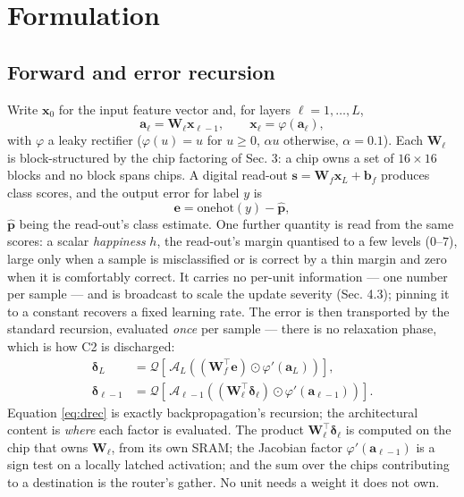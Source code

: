 \documentclass[11pt]{article}
\newcommand{\W}{\bm W}
\newcommand{\x}{\bm x}
\newcommand{\bdelta}{\bm\delta}
\begin{document}
\hypertarget{sec:theory}{%
\section{Formulation}\label{sec:theory}}

\hypertarget{forward-and-error-recursion}{%
\subsection{Forward and error
recursion}\label{forward-and-error-recursion}}

Write \(\bm x_0\) for the input feature vector and, for layers
\(\ell = 1,\dots,L\),
\begin{equation}
\bm a_\ell = \W_\ell \x_{\ell-1}, \qquad \x_\ell = \varphi(\bm a_\ell),
\end{equation}
with \(\varphi\) a leaky rectifier (\(\varphi(u) = u\) for \(u \ge 0\),
\(\alpha u\) otherwise, \(\alpha = 0.1\)). Each \(\bm W_\ell\) is
block-structured by the chip factoring of Sec. 3: a chip owns a set of
\(16\times16\) blocks and no block spans chips. A digital read-out
\(\bm s = \bm W_f \bm x_L + \bm b_f\) produces class scores, and the
output error for label \(y\) is
\begin{equation}
\bm e = \mathrm{onehot}(y) - \hat{\bm p},
\end{equation} \(\hat{\bm p}\) being the
read-out's class estimate. One further quantity is read from the same
scores: a scalar \emph{happiness} \(h\), the read-out's margin quantised
to a few levels (\(0\)--\(7\)), large only when a sample is
misclassified or is correct by a thin margin and zero when it is
comfortably correct. It carries no per-unit information --- one number
per sample --- and is broadcast to scale the update severity (Sec. 4.3);
pinning it to a constant recovers a fixed learning rate. The error is
then transported by the standard recursion, evaluated \emph{once} per
sample --- there is no relaxation phase, which is how C2 is discharged:
\begin{align}
\bdelta_L &= \mathcal{Q}\!\left[\,\mathcal{A}_L\!\left((\W_f^{\!\top}\bm e)\odot\varphi'(\bm a_L)\right)\right],\label{eq:dL}\\
\bdelta_{\ell-1} &= \mathcal{Q}\!\left[\,\mathcal{A}_{\ell-1}\!\left((\W_\ell^{\!\top}\bdelta_\ell)\odot\varphi'(\bm a_{\ell-1})\right)\right].\label{eq:drec}
\end{align} Equation \eqref{eq:drec} is exactly backpropagation's recursion; the
architectural content is \emph{where} each factor is evaluated. The
product \(\bm W_\ell^{\!\top}\bm\delta_\ell\) is computed on the chip
that owns \(\bm W_\ell\), from its own SRAM; the Jacobian factor
\(\varphi'(\bm a_{\ell-1})\) is a sign test on a locally latched
activation; and the sum over the chips contributing to a destination is
the router's gather. No unit needs a weight it does not own.
\end{document}
